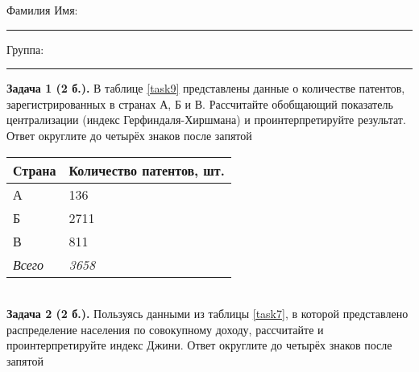 \documentclass{article}
\begin{document}
\mbox{}

\vspace{-36pt}

\begin{center}
	\begin{tcolorbox}[colback=white, boxrule=0.20ex, sharp corners = all, height=25pt, colframe=black, valign=top]
		\begin{center}
			Фамилия Имя:\hspace{1.5pt}\rule{190pt}{0pt}\hspace{50pt}Группа:\hspace{1.5pt}\rule{60pt}{0pt}
		\end{center}
	\end{tcolorbox}
\end{center}
\vspace{3pt}

\textbf{Задача 1 (2 б.).} В таблице \ref{task9} представлены данные о количестве патентов, зарегистрированных в странах А, Б и В. Рассчитайте обобщающий показатель централизации (индекс Герфиндаля-Хиршмана) и проинтерпретируйте результат. Ответ округлите до четырёх знаков после запятой\\

\begin{minipage}{\textwidth}
\centering
\begin{tabularx}{0.4\textwidth}{YY}
\toprule
\textbf{Страна} & \textbf{Количество патентов, шт.} \\
\midrule
А & 136 \\

Б & 2711 \\

В & 811 \\
\addlinespace
\textit{Всего} & \textit{3658} \\
\bottomrule
\end{tabularx}
\label{task9}
\end{minipage} \\[35pt]

\textbf{Задача 2 (2 б.).} Пользуясь данными из таблицы \ref{task7}, в которой представлено распределение населения по совокупному доходу, рассчитайте и проинтерпретируйте индекс Джини. Ответ округлите до четырёх знаков после запятой\\
\end{document}
